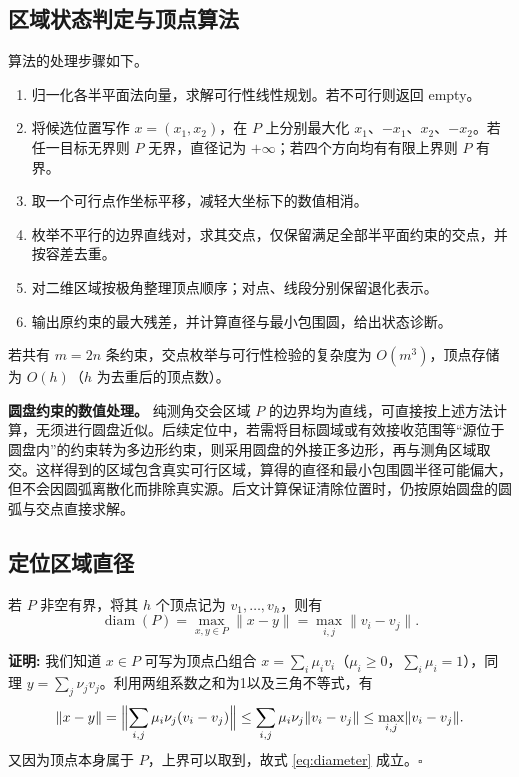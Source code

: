 \documentclass[UTF8,a4paper,zihao=-4,fontset=none]{ctexart}
\begin{document}
\subsection{区域状态判定与顶点算法}

算法的处理步骤如下。

\begin{enumerate}[label=(\arabic*),leftmargin=2.2em]
  \item 归一化各半平面法向量，求解可行性线性规划。若不可行则返回 empty。
  \item 将候选位置写作 \(x=(x_1,x_2)\)，在 \(P\) 上分别最大化 \(x_1\)、\(-x_1\)、\(x_2\)、\(-x_2\)。若任一目标无界则 \(P\) 无界，直径记为 \(+\infty\)；若四个方向均有有限上界则 \(P\) 有界。
  \item 取一个可行点作坐标平移，减轻大坐标下的数值相消。
  \item 枚举不平行的边界直线对，求其交点，仅保留满足全部半平面约束的交点，并按容差去重。
  \item 对二维区域按极角整理顶点顺序；对点、线段分别保留退化表示。
  \item 输出原约束的最大残差，并计算直径与最小包围圆，给出状态诊断。
\end{enumerate}

若共有 \(m=2n\) 条约束，交点枚举与可行性检验的复杂度为 \(O(m^3)\)，顶点存储为 \(O(h)\)（\(h\) 为去重后的顶点数）。

\textbf{圆盘约束的数值处理。} 纯测角交会区域 \(P\) 的边界均为直线，可直接按上述方法计算，无须进行圆盘近似。后续定位中，若需将目标圆域或有效接收范围等“源位于圆盘内”的约束转为多边形约束，则采用圆盘的外接正多边形，再与测角区域取交。这样得到的区域包含真实可行区域，算得的直径和最小包围圆半径可能偏大，但不会因圆弧离散化而排除真实源。后文计算保证清除位置时，仍按原始圆盘的圆弧与交点直接求解。

\subsection{定位区域直径}

若 \(P\) 非空有界，将其 \(h\) 个顶点记为 \(v_1,\dots,v_h\)，则有
\begin{equation}
  \operatorname{diam}(P)=\max_{x,y\in P}\lVert x-y\rVert=\max_{i,j}\lVert v_i-v_j\rVert .
  \label{eq:diameter}
\end{equation}

\textbf{证明:} 我们知道 \(x\in P\) 可写为顶点凸组合 \(x=\sum_i\mu_iv_i\)（\(\mu_i\ge0\)，\(\sum_i\mu_i=1\)），同理 \(y=\sum_j\nu_jv_j\)。利用两组系数之和为1以及三角不等式，有
\begin{equation}
  \lVert x-y\rVert
  =\Bigl\lVert\sum_{i,j}\mu_i\nu_j(v_i-v_j)\Bigr\rVert
  \le\sum_{i,j}\mu_i\nu_j\lVert v_i-v_j\rVert
  \le\max_{i,j}\lVert v_i-v_j\rVert .
\end{equation}
又因为顶点本身属于 \(P\)，上界可以取到，故式 \eqref{eq:diameter} 成立。\(\square\) 
\end{document}
